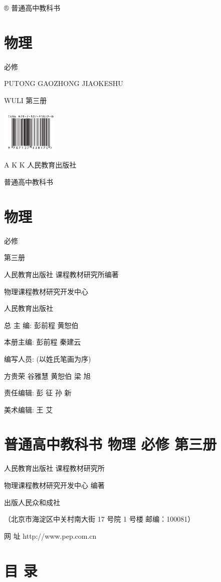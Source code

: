 \documentclass[10pt]{article}
\begin{document}
® 普通高中教科书

\section*{物理}

必修

PUTONG GAOZHONG JIAOKESHU

WULI 第三册

\begin{center}
\includegraphics[max width=0.2\textwidth]{images/01911d5f-8e38-70c0-b5b8-2b399bd115b6_1_680633.jpg}
\end{center}

A K K 人民教育出版社

普通高中教科书

\section*{物理}

必修

第三册

人民教育出版社 课程教材研究所编著

物理课程教材研究开发中心

人民教育出版社

总 主 编: 彭前程 黄恕伯

本册主编: 彭前程 秦建云

编写人员: (以姓氏笔画为序)

方贵荣 谷雅慧 黄恕伯 梁 旭

责任编辑: 彭 征 孙 新

美术编辑: 王 艾

\section*{普通高中教科书 物理 必修 第三册}

人民教育出版社 课程教材研究所

物理课程教材研究开发中心 编著

出版人民众和成社

（北京市海淀区中关村南大街 17 号院 1 号楼 邮编：100081）

网 址 http://www.pep.com.cn

\section*{目 录}
\end{document}
